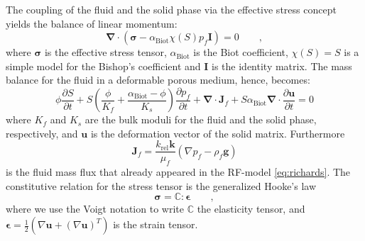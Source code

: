 The coupling of the fluid and the solid phase via the effective stress concept yields the balance of linear momentum:
\begin{equation}\label{eq:linear_momentum}
\boldsymbol{\nabla} \cdot \left( \boldsymbol{\sigma} - \alpha_\text{Biot} \chi(S) p_f \textbf{I} \right) = 0 \qquad,
\end{equation}
where $\boldsymbol{\sigma}$ is the effective stress tensor, $\alpha_\text{Biot}$ is the Biot coefficient, $\chi(S)=S$ is a simple model for the Bishop's coefficient and $\textbf{I}$ is the identity matrix. The mass balance for the fluid in a deformable porous medium, hence, becomes:
\begin{equation}\label{eq:mass_balance}
 \phi \frac{\partial S}{\partial t} + S\left(\frac{\phi}{K_f}+\frac{\alpha_\text{Biot}-\phi}{K_s}\right) \frac{\partial p_f}{\partial t}+ \boldsymbol{\nabla} \cdot \textbf{J}_f + S \alpha_\text{Biot} \boldsymbol{\nabla} \cdot \frac{\partial \textbf{u}}{\partial t} = 0
\end{equation}
where $K_f$ and $K_s$ are the bulk moduli for the fluid and the solid phase, respectively, and $\textbf{u}$ is the deformation vector of the solid matrix. Furthermore
\begin{equation}
\textbf{J}_f=\frac{k_\text{rel}\textbf{k}}{\mu_f}(\nabla p_f-\rho_f \textbf{g})
\end{equation}
is the fluid mass flux that already appeared in the RF-model \eqref{eq:richards}.
The constitutive relation for the stress tensor is the generalized Hooke's law
\begin{equation}\label{eq:hookes_law}
\boldsymbol{\sigma} = \mathds{C} \colon \boldsymbol{\epsilon} \qquad ,
\end{equation}
where we use the Voigt notation to write $\mathds{C}$ the elasticity tensor, and $\boldsymbol{\epsilon}=\frac{1}{2}\left(\nabla \textbf{u} + (\nabla \textbf{u})^T\right)$ is the strain tensor. 

